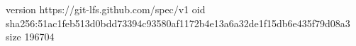 version https://git-lfs.github.com/spec/v1
oid sha256:51ac1feb513d0bdd73394c93580af1172b4e13a6a32de1f15db6e435f79d08a3
size 196704
